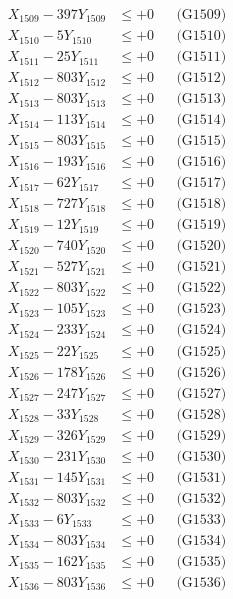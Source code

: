 \documentclass[a4paper,10pt]{article}
\begin{document}
{\begin{align}
X_{1509} - 397Y_{1509} &\leq +0 && \text{(G1509)} \\
X_{1510} - 5Y_{1510} &\leq +0 && \text{(G1510)} \\
\allowbreak
X_{1511} - 25Y_{1511} &\leq +0 && \text{(G1511)} \\
X_{1512} - 803Y_{1512} &\leq +0 && \text{(G1512)} \\
X_{1513} - 803Y_{1513} &\leq +0 && \text{(G1513)} \\
X_{1514} - 113Y_{1514} &\leq +0 && \text{(G1514)} \\
X_{1515} - 803Y_{1515} &\leq +0 && \text{(G1515)} \\
X_{1516} - 193Y_{1516} &\leq +0 && \text{(G1516)} \\
X_{1517} - 62Y_{1517} &\leq +0 && \text{(G1517)} \\
X_{1518} - 727Y_{1518} &\leq +0 && \text{(G1518)} \\
X_{1519} - 12Y_{1519} &\leq +0 && \text{(G1519)} \\
X_{1520} - 740Y_{1520} &\leq +0 && \text{(G1520)} \\
\allowbreak
X_{1521} - 527Y_{1521} &\leq +0 && \text{(G1521)} \\
X_{1522} - 803Y_{1522} &\leq +0 && \text{(G1522)} \\
X_{1523} - 105Y_{1523} &\leq +0 && \text{(G1523)} \\
X_{1524} - 233Y_{1524} &\leq +0 && \text{(G1524)} \\
X_{1525} - 22Y_{1525} &\leq +0 && \text{(G1525)} \\
X_{1526} - 178Y_{1526} &\leq +0 && \text{(G1526)} \\
X_{1527} - 247Y_{1527} &\leq +0 && \text{(G1527)} \\
X_{1528} - 33Y_{1528} &\leq +0 && \text{(G1528)} \\
X_{1529} - 326Y_{1529} &\leq +0 && \text{(G1529)} \\
X_{1530} - 231Y_{1530} &\leq +0 && \text{(G1530)} \\
\allowbreak
X_{1531} - 145Y_{1531} &\leq +0 && \text{(G1531)} \\
X_{1532} - 803Y_{1532} &\leq +0 && \text{(G1532)} \\
X_{1533} - 6Y_{1533} &\leq +0 && \text{(G1533)} \\
X_{1534} - 803Y_{1534} &\leq +0 && \text{(G1534)} \\
X_{1535} - 162Y_{1535} &\leq +0 && \text{(G1535)} \\
X_{1536} - 803Y_{1536} &\leq +0 && \text{(G1536)} \\

\end{align}}
\end{document}
